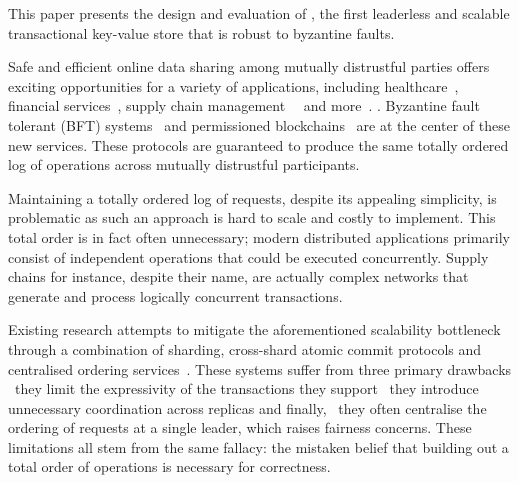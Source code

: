 This paper presents the design and evaluation of \sys{}, the
first leaderless and scalable transactional key-value store that is robust to byzantine faults.

Safe and efficient online data sharing among mutually distrustful
parties offers exciting opportunities for a variety of applications,
including healthcare~\cite{}, financial services~\cite{}, supply chain
management~~\cite{} and more~\cite{}. . Byzantine fault tolerant (BFT)
systems~\cite{castro1999practical,martin2006fast,kotla2007zyzzyva,  gueta2018sbft,clement2009making,buchman2016tendermint,yin2019hotstuff,Clement09Upright,duan2014hbft, pires2018generalized,bessani2014state,lamport2011byzantizing,arun2019ezbft, malkhi2019flexible,duan2014hbft,yin2003separating, Guerraoui08Next, Kotla04High,liskov2010viewstamped} and permissioned blockchains~\cite{Hyperledger,EthereumQuorum, buchman2016tendermint, al2017chainspace,kokoris2018omniledger,gilad2017algorand, baudet2019state} are at the center of these new services. These protocols are guaranteed to
produce the same totally ordered log of operations across mutually distrustful
participants. 

Maintaining a totally ordered log of requests, despite its appealing simplicity, is problematic as such an approach is hard to scale and costly to implement. This total order is in fact often unnecessary; modern distributed applications primarily consist of independent operations that could be executed concurrently. Supply chains for instance, despite their name, are actually complex networks that generate and process logically concurrent transactions.

Existing research attempts to mitigate the aforementioned scalability bottleneck through a combination of sharding, cross-shard atomic commit protocols and centralised ordering services~\cite{kokoris2018omniledger,al2017chainspace,padilha2016callinicos}. These systems suffer from three primary drawbacks \one~they limit the expressivity of the transactions they support \two~they introduce unnecessary coordination across replicas and finally,
\three~they often centralise the ordering of requests at a single leader, which raises fairness concerns. These limitations all stem from the same fallacy: the mistaken belief that building out a total order of operations is necessary for correctness.
 
